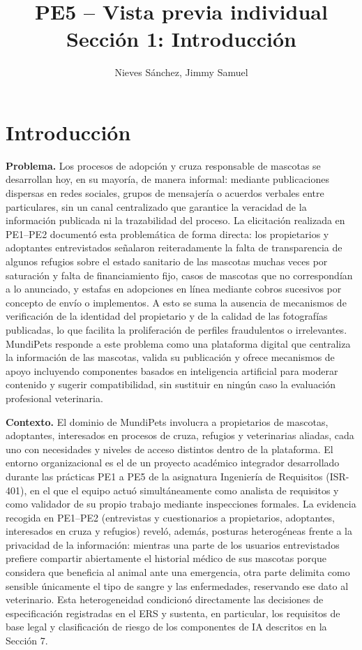 \documentclass[12pt,a4paper]{article}
\title{PE5 -- Vista previa individual\\Sección 1: Introducción}
\author{Nieves Sánchez, Jimmy Samuel}
\date{}
\begin{document}
\maketitle



\section{Introducción}

\textbf{Problema.} Los procesos de adopción y cruza responsable de mascotas se
desarrollan hoy, en su mayoría, de manera informal: mediante publicaciones dispersas
en redes sociales, grupos de mensajería o acuerdos verbales entre particulares, sin
un canal centralizado que garantice la veracidad de la información publicada ni la
trazabilidad del proceso. La elicitación realizada en PE1--PE2 documentó esta
problemática de forma directa: los propietarios y adoptantes entrevistados señalaron
reiteradamente la falta de transparencia de algunos refugios sobre el estado
sanitario de las mascotas muchas veces por saturación y falta de financiamiento
fijo, casos de mascotas que no correspondían a lo anunciado, y estafas en
adopciones en línea mediante cobros sucesivos por concepto de envío o implementos. A esto se suma la ausencia de mecanismos de verificación de la
identidad del propietario y de la calidad de las fotografías publicadas, lo que
facilita la proliferación de perfiles fraudulentos o irrelevantes. MundiPets
responde a este problema como una plataforma digital que centraliza la información
de las mascotas, valida su publicación y ofrece mecanismos de apoyo incluyendo
componentes basados en inteligencia artificial para moderar contenido y sugerir
compatibilidad, sin sustituir en ningún caso la evaluación profesional veterinaria.

\textbf{Contexto.} El dominio de MundiPets involucra a propietarios de mascotas,
adoptantes, interesados en procesos de cruza, refugios y veterinarias aliadas, cada
uno con necesidades y niveles de acceso distintos dentro de la plataforma. El
entorno organizacional es el de un proyecto académico integrador desarrollado
durante las prácticas PE1 a PE5 de la asignatura Ingeniería de Requisitos
(ISR-401), en el que el equipo actuó simultáneamente como analista de requisitos y
como validador de su propio trabajo mediante inspecciones formales. La evidencia
recogida en PE1--PE2 (entrevistas y cuestionarios a propietarios, adoptantes,
interesados en cruza y refugios) reveló, además, posturas heterogéneas frente a la
privacidad de la información: mientras una parte de los usuarios entrevistados
prefiere compartir abiertamente el historial médico de sus mascotas porque considera
que beneficia al animal ante una emergencia, otra parte delimita como sensible
únicamente el tipo de sangre y las enfermedades, reservando ese dato al veterinario. Esta heterogeneidad condicionó directamente las decisiones de
especificación registradas en el ERS y sustenta, en particular, los requisitos de
base legal y clasificación de riesgo de los componentes de IA descritos en la
Sección 7.
\end{document}
